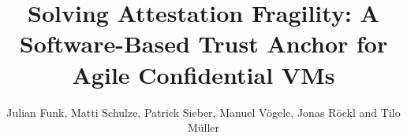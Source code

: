 \documentclass[runningheads]{llncs}
\begin{document}
\setcounter{page}{8}
\author{Julian Funk, Matti Schulze, Patrick Sieber, Manuel V\"ogele, Jonas
R\"ockl and Tilo M\"uller}
\title{Solving Attestation Fragility: A Software-Based Trust Anchor for Agile Confidential VMs}
\maketitle

\clearpage
\setcounter{page}{9}
\phantom{Author Index}
\clearpage
\end{document}
